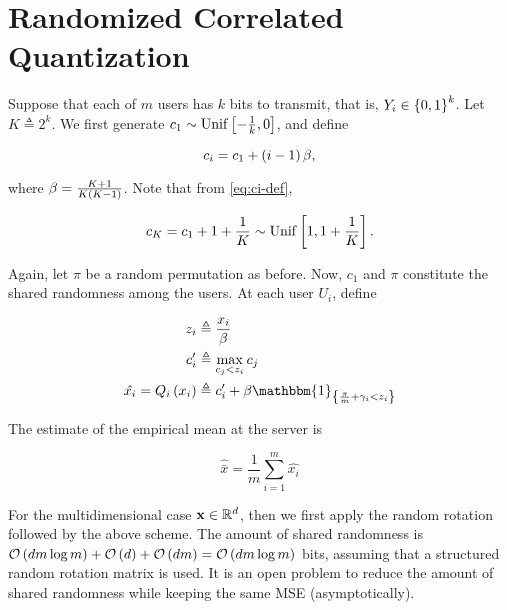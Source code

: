 \documentclass[twoside]{article}
\begin{document}



\section{Randomized Correlated Quantization}

Suppose that each of \(m\) users has \(k\) bits to transmit, that is, 
\(Y_i \in \left\{0,1\right\}^k\). Let \(K \triangleq 2^k\). We first generate
\(c_1 \sim \mathrm{Unif}{}\left[-\frac{1}{k},0\right]\), and define

\begin{equation}
    c_i = c_1 + \left(i-1\right)\beta,
    \label{eq:ci-def}
\end{equation}

where \(\beta = \frac{K+1}{K\left(K-1\right)}\). Note that from \eqref{eq:ci-def},

\begin{equation}
    c_K = c_1 + 1 + \frac{1}{K} \sim \mathrm{Unif}{}\left[1,1+\frac{1}{K}\right].
    \label{eq:cK-distr}
\end{equation}

Again, let \(\pi\) be a random permutation as before. Now, \(c_1\) and \(\pi\)
constitute the shared randomness among the users. At each user \(U_i\), define

\begin{align}
    z_i &\triangleq \frac{x_i}{\beta} \label{eq:zi-def} \\
    c_i^\prime &\triangleq \max_{c_j<z_i}c_j \label{eq:ci-prime-def} \\
    \hat{x_i} = Q_i\brak{x_i} &\triangleq c_i^\prime + \beta\mathbbm{1}_{\cbrak{\frac{\pi}{m}+\gamma_i<z_i}} \label{eq:Qi-def}
\end{align}

The estimate of the empirical mean at the server is

\begin{equation}
    \hat{\bar{x}} = \frac{1}{m}\sum_{i=1}^m \hat{x_i}
    \label{eq:emp-mean}
\end{equation}

For the multidimensional case \(\boldsymbol{\mathbf{x}}\in\mathbb R^d\), then we first apply the
random rotation followed by the above scheme. The amount of shared randomness
is \(\mathcal O\left(dm\log{m}\right) + \mathcal O\left(d\right) + \mathcal O\left(dm\right) = \mathcal O\left(dm\log{m}\right)\) 
bits, assuming that a structured random rotation matrix is used. It is an
open problem to reduce the amount of shared randomness while keeping the same
MSE (asymptotically).
\end{document}
